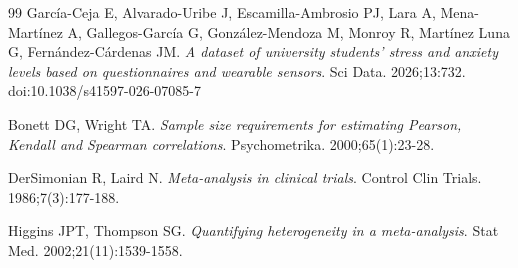 \documentclass[11pt, a4paper, oneside]{article}
\begin{document}
\begin{thebibliography}{99}
García-Ceja E, Alvarado-Uribe J, Escamilla-Ambrosio PJ, Lara A, Mena-Martínez A, Gallegos-García G, González-Mendoza M, Monroy R, Martínez Luna G, Fernández-Cárdenas JM. \textit{A dataset of university students' stress and anxiety levels based on questionnaires and wearable sensors}. Sci Data. 2026;13:732. doi:10.1038/s41597-026-07085-7

Bonett DG, Wright TA. \textit{Sample size requirements for estimating Pearson, Kendall and Spearman correlations}. Psychometrika. 2000;65(1):23-28.

DerSimonian R, Laird N. \textit{Meta-analysis in clinical trials}. Control Clin Trials. 1986;7(3):177-188.

Higgins JPT, Thompson SG. \textit{Quantifying heterogeneity in a meta-analysis}. Stat Med. 2002;21(11):1539-1558.


\end{thebibliography}
\end{document}
